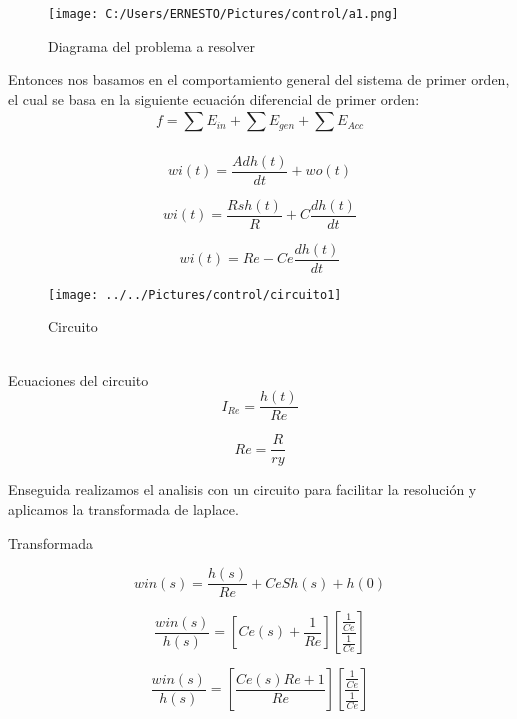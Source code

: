 \documentclass{article}
\begin{document}
\begin{figure}[h!]
	\centering
\texttt{[image: C:/Users/ERNESTO/Pictures/control/a1.png]}
\caption{Diagrama del problema a resolver}
\end{figure}

Entonces nos basamos en el comportamiento general del sistema de primer orden, el cual se basa en la siguiente ecuación diferencial de primer orden:
\begin{equation}
f =\sum_{}^{}E_{in} + \sum_{}^{}E_{gen} +\sum_{}^{}E_{Acc}
\end{equation}

\begin{equation}
wi(t)= \frac{Adh(t)}{dt} + wo(t)
\end{equation}

\begin{equation}
wi(t)= \frac{Rsh(t)}{R} + C \frac{dh(t)}{dt}
\end{equation}

\begin{equation}
wi(t)= Re - Ce \frac{dh(t)}{dt}
\end{equation}
\begin{figure}[h!]
	\centering
\texttt{[image: ../../Pictures/control/circuito1]}
	\caption{Circuito}
\end{figure}\\
Ecuaciones del circuito
\begin{equation}
I_{Re} = \frac{h(t)}{Re}
\end{equation}

\begin{equation}
Re = \frac{R}{ry}
\end{equation}

Enseguida realizamos el analisis con un circuito para facilitar la resolución y aplicamos la transformada de laplace.

Transformada

\begin{equation}
win(s)= \frac{h(s)}{Re} + CeSh(s)+h(0)
\end{equation}

\begin{equation}
\frac{win(s)}{h(s)}=[Ce(s)+\frac{1}{Re}] [\frac{\frac{1}{Ce}} { \frac{1}{Ce}}]
\end{equation}


\begin{equation}
\frac{win(s)}{h(s)}=[\frac{Ce(s)Re+1}{Re}] [\frac{\frac{1}{Ce}} { \frac{1}{Ce}}]
\end{equation}
\end{document}
